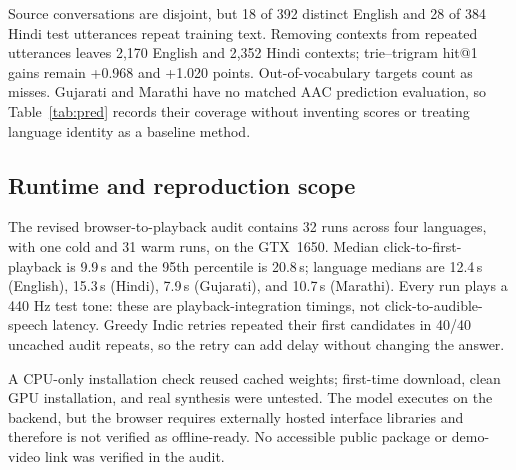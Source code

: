 Source conversations are disjoint, but 18 of 392 distinct English and 28 of 384 Hindi test utterances repeat training text.
Removing contexts from repeated utterances leaves 2,170 English and 2,352 Hindi contexts; trie--trigram hit@1 gains remain +0.968 and +1.020 points.
Out-of-vocabulary targets count as misses.
Gujarati and Marathi have no matched AAC prediction evaluation, so Table~\ref{tab:pred} records their coverage without inventing scores or treating language identity as a baseline method.

\subsection{Runtime and reproduction scope}
The revised browser-to-playback audit contains 32 runs across four languages, with one cold and 31 warm runs, on the GTX~1650.
Median click-to-first-playback is 9.9\,s and the 95th percentile is 20.8\,s; language medians are 12.4\,s (English), 15.3\,s (Hindi), 7.9\,s (Gujarati), and 10.7\,s (Marathi).
Every run plays a 440 Hz test tone: these are playback-integration timings, not click-to-audible-speech latency.
Greedy Indic retries repeated their first candidates in 40/40 uncached audit repeats, so the retry can add delay without changing the answer.

A CPU-only installation check reused cached weights; first-time download, clean GPU installation, and real synthesis were untested.
The model executes on the backend, but the browser requires externally hosted interface libraries and therefore is not verified as offline-ready.
No accessible public package or demo-video link was verified in the audit.
